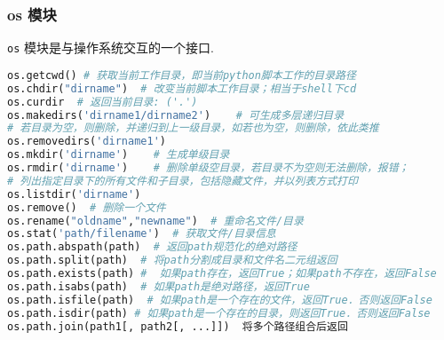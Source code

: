 \subsubsection{os 模块}
\verb|os| 模块是与操作系统交互的一个接口.
\begin{lstlisting}[language=python]
os.getcwd() # 获取当前工作目录，即当前python脚本工作的目录路径
os.chdir("dirname")  # 改变当前脚本工作目录；相当于shell下cd
os.curdir  # 返回当前目录: ('.')
os.makedirs('dirname1/dirname2')    # 可生成多层递归目录
# 若目录为空，则删除，并递归到上一级目录，如若也为空，则删除，依此类推
os.removedirs('dirname1')
os.mkdir('dirname')    # 生成单级目录
os.rmdir('dirname')    # 删除单级空目录，若目录不为空则无法删除，报错；
# 列出指定目录下的所有文件和子目录，包括隐藏文件，并以列表方式打印
os.listdir('dirname')
os.remove()  # 删除一个文件
os.rename("oldname","newname")  # 重命名文件/目录
os.stat('path/filename')  # 获取文件/目录信息
os.path.abspath(path)  # 返回path规范化的绝对路径
os.path.split(path)  # 将path分割成目录和文件名二元组返回
os.path.exists(path) #  如果path存在，返回True；如果path不存在，返回False
os.path.isabs(path)  # 如果path是绝对路径，返回True
os.path.isfile(path)  # 如果path是一个存在的文件，返回True．否则返回False
os.path.isdir(path) # 如果path是一个存在的目录，则返回True．否则返回False
os.path.join(path1[, path2[, ...]])  将多个路径组合后返回
\end{lstlisting}
